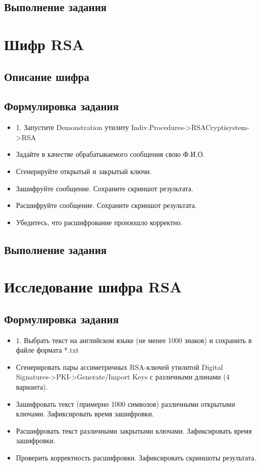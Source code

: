 \documentclass[a4paper, 14pt]{extarticle}
\begin{document}
\subsection{Выполнение задания}
\lipsum[1] %

\section{Шифр RSA}
\subsection{Описание шифра}
\lipsum[1] %

\subsection{Формулировка задания}
\begin{itemize}
    \item 1. Запустите Demonstration утилиту Indiv.Procedures->RSACryptisystem->RSA
    \item  Задайте в качестве обрабатываемого сообщения свою Ф.И.О.
    \item  Сгенерируйте открытый и закрытый ключи.
    \item  Зашифруйте сообщение. Сохраните скриншот результата.
    \item  Расшифруйте сообщение. Сохраните скриншот результата.
    \item Убедитесь, что расшифрование произошло корректно.
\end{itemize}

\subsection{Выполнение задания}
\lipsum[1] %

\section{Исследование шифра RSA}
\subsection{Формулировка задания}
\begin{itemize}
    \item 1. Выбрать текст на английском языке (не менее 1000 знаков) и сохранить в файле формата *.txt
    \item  Сгенерировать пары ассиметричных RSA-ключей утилитой Digital Signatures->PKI->Generate/Import Keys с различными длинами (4 варианта).
    \item  Зашифровать текст (примерно 1000 символов) различными открытыми ключами. Зафиксировать время зашифровки.
    \item  Расшифровать текст различными закрытыми ключами. Зафиксировать время зашифровки.
    \item  Проверить корректность расшифровки. Зафиксировать скриншоты результата.
\end{itemize}
\end{document}
